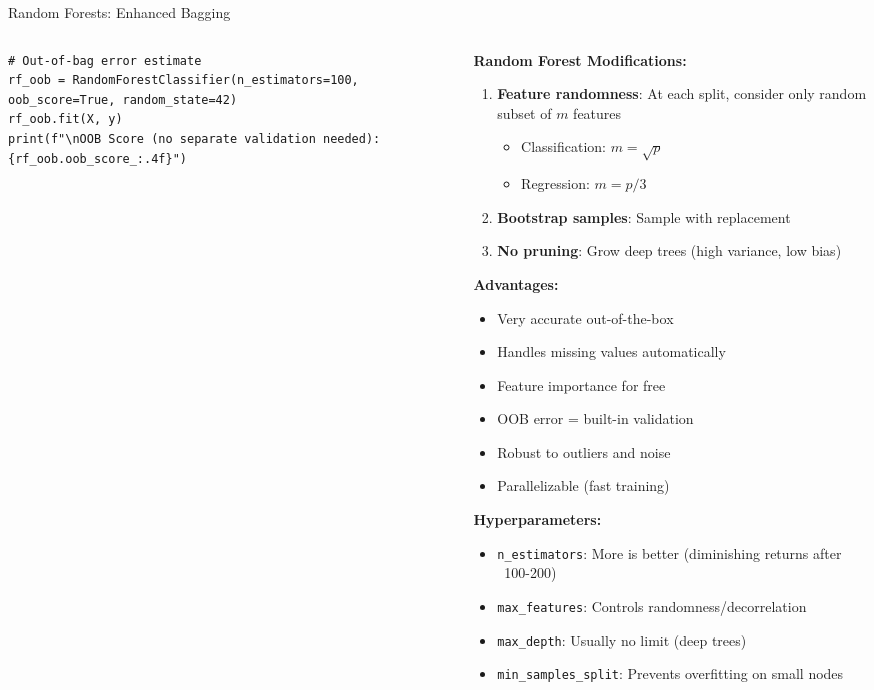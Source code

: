 \begin{frame}[fragile]{Random Forests: Enhanced Bagging}
\begin{columns}
\begin{column}{0.55\textwidth}
\begin{lstlisting}[basicstyle=\ttfamily\tiny]
# Out-of-bag error estimate
rf_oob = RandomForestClassifier(n_estimators=100, oob_score=True, random_state=42)
rf_oob.fit(X, y)
print(f"\nOOB Score (no separate validation needed): {rf_oob.oob_score_:.4f}")
\end{lstlisting}
\end{column}
\begin{column}{0.45\textwidth}
\textbf{Random Forest Modifications:}

\begin{enumerate}
\item \textbf{Feature randomness}: At each split, consider only random subset of $m$ features
   \begin{itemize}
   \item Classification: $m = \sqrt{p}$
   \item Regression: $m = p/3$
   \end{itemize}

\item \textbf{Bootstrap samples}: Sample with replacement

\item \textbf{No pruning}: Grow deep trees (high variance, low bias)
\end{enumerate}

\vspace{0.3cm}
\textbf{Advantages:}
\begin{itemize}
\item \textcolor{forest}{Very accurate} out-of-the-box
\item \textcolor{forest}{Handles missing values} automatically
\item \textcolor{forest}{Feature importance} for free
\item \textcolor{forest}{OOB error} = built-in validation
\item \textcolor{forest}{Robust} to outliers and noise
\item \textcolor{forest}{Parallelizable} (fast training)
\end{itemize}

\vspace{0.3cm}
\textbf{Hyperparameters:}
\begin{itemize}
\item \texttt{n\_estimators}: More is better (diminishing returns after ~100-200)
\item \texttt{max\_features}: Controls randomness/decorrelation
\item \texttt{max\_depth}: Usually no limit (deep trees)
\item \texttt{min\_samples\_split}: Prevents overfitting on small nodes
\end{itemize}
\end{column}
\end{columns}
\end{frame}

